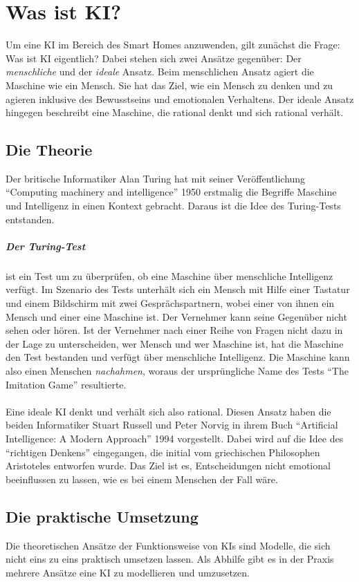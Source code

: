 \chapter{Was ist KI?}
Um eine \gls{KI} im Bereich des Smart Homes anzuwenden, gilt zunächst die Frage: Was ist \gls{KI} eigentlich? Dabei stehen sich zwei Ansätze gegenüber: Der \textit{menschliche} und der \textit{ideale} Ansatz. Beim menschlichen Ansatz agiert die Maschine wie ein Mensch. Sie hat das Ziel, wie ein Mensch zu denken und zu agieren inklusive des Bewusstseins und emotionalen Verhaltens. Der ideale Ansatz hingegen beschreibt eine Maschine, die rational denkt und sich rational verhält.

\section{Die Theorie}
Der britische Informatiker Alan Turing hat mit seiner Veröffentlichung \enquote{Computing machinery and intelligence} 1950 erstmalig die Begriffe Maschine und Intelligenz in einen Kontext gebracht. Daraus ist die Idee des Turing-Tests entstanden.
\paragraph{Der Turing-Test} ist ein Test um zu überprüfen, ob eine Maschine über menschliche Intelligenz verfügt. Im Szenario des Tests unterhält sich ein Mensch mit Hilfe einer Tastatur und einem Bildschirm mit zwei Gesprächspartnern, wobei einer von ihnen ein Mensch und einer eine Maschine ist. Der Vernehmer kann seine Gegenüber nicht sehen oder hören. Ist der Vernehmer nach einer Reihe von Fragen nicht dazu in der Lage zu unterscheiden, wer Mensch und wer Maschine ist, hat die Maschine den Test bestanden und verfügt über menschliche Intelligenz. Die Maschine kann also einen Menschen \textit{nachahmen}, woraus der ursprüngliche Name des Tests \enquote{The Imitation Game} resultierte.\\\\
Eine ideale \gls{KI} denkt und verhält sich also rational. Diesen Ansatz haben die beiden Informatiker Stuart Russell und Peter Norvig in ihrem Buch \enquote{Artificial Intelligence: A Modern Approach} 1994 vorgestellt. Dabei wird auf die Idee des \enquote{richtigen Denkens} eingegangen, die initial vom griechischen Philosophen Aristoteles entworfen wurde. Das Ziel ist es, Entscheidungen nicht emotional beeinflussen zu lassen, wie es bei einem Menschen der Fall wäre.

\section{Die praktische Umsetzung}
Die theoretischen Ansätze der Funktionsweise von \glspl{KI} sind Modelle, die sich nicht eins zu eins praktisch umsetzen lassen. Als Abhilfe gibt es in der Praxis mehrere Ansätze eine \gls{KI} zu modellieren und umzusetzen.

